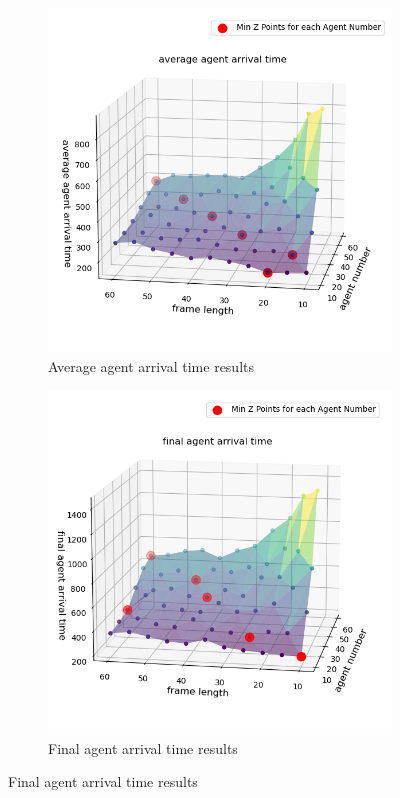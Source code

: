 \begin{figure}[htbp]
    \centering
    \begin{subfigure}[t]{0.45\linewidth}
      \centering
      \includegraphics[width = \linewidth]{figures/avg_arrival_time.png}
      \caption{Average agent arrival time results}
      \label{fig:Performance1}
    \end{subfigure}
    \hfill
    \begin{subfigure}[t]{0.45\linewidth}
        \centering
        \includegraphics[width = \linewidth]{figures/final_agent_arrival_time.png}
        \caption{Final agent arrival time results}
        \label{fig:Performance2}
    \end{subfigure}
    

\end{figure}
